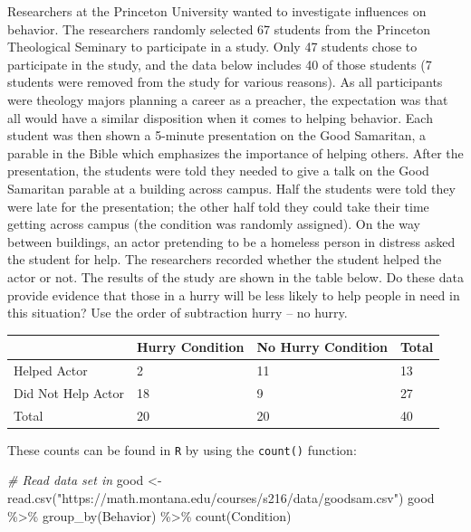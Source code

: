 \documentclass[
]{report}
\newenvironment{Shaded}{\begin{snugshade}}{\end{snugshade}}
\newcommand{\CommentTok}[1]{\textcolor[rgb]{0.56,0.35,0.01}{\textit{#1}}}
\newcommand{\FunctionTok}[1]{\textcolor[rgb]{0.00,0.00,0.00}{#1}}
\newcommand{\NormalTok}[1]{#1}
\newcommand{\OtherTok}[1]{\textcolor[rgb]{0.56,0.35,0.01}{#1}}
\newcommand{\SpecialCharTok}[1]{\textcolor[rgb]{0.00,0.00,0.00}{#1}}
\newcommand{\StringTok}[1]{\textcolor[rgb]{0.31,0.60,0.02}{#1}}
\begin{document}
Researchers at the Princeton University wanted to investigate influences on behavior. The researchers randomly selected 67 students from the Princeton Theological Seminary to participate in a study. Only 47 students chose to participate in the study, and the data below includes 40 of those students (7 students were removed from the study for various reasons). As all participants were theology majors planning a career as a preacher, the expectation was that all would have a similar disposition when it comes to helping behavior. Each student was then shown a 5-minute presentation on the Good Samaritan, a parable in the Bible which emphasizes the importance of helping others. After the presentation, the students were told they needed to give a talk on the Good Samaritan parable at a building across campus. Half the students were told they were late for the presentation; the other half told they could take their time getting across campus (the condition was randomly assigned). On the way between buildings, an actor pretending to be a homeless person in distress asked the student for help. The researchers recorded whether the student helped the actor or not. The results of the study are shown in the table below. Do these data provide evidence that those in a hurry will be less likely to help people in need in this situation? Use the order of subtraction hurry -- no hurry.

\begin{longtable}[]{@{}llll@{}}
\toprule
& Hurry Condition & No Hurry Condition & Total \\
\midrule
\endhead
Helped Actor & 2 & 11 & 13 \\
Did Not Help Actor & 18 & 9 & 27 \\
Total & 20 & 20 & 40 \\
\bottomrule
\end{longtable}

\newpage

These counts can be found in \texttt{R} by using the \texttt{count()} function:

\begin{Shaded}
\begin{Highlighting}[]
\CommentTok{\# Read data set in}
\NormalTok{good }\OtherTok{\textless{}{-}} \FunctionTok{read.csv}\NormalTok{(}\StringTok{"https://math.montana.edu/courses/s216/data/goodsam.csv"}\NormalTok{) }
\NormalTok{good }\SpecialCharTok{\%\textgreater{}\%} \FunctionTok{group\_by}\NormalTok{(Behavior) }\SpecialCharTok{\%\textgreater{}\%} \FunctionTok{count}\NormalTok{(Condition)}
\end{Highlighting}
\end{Shaded}
\end{document}
